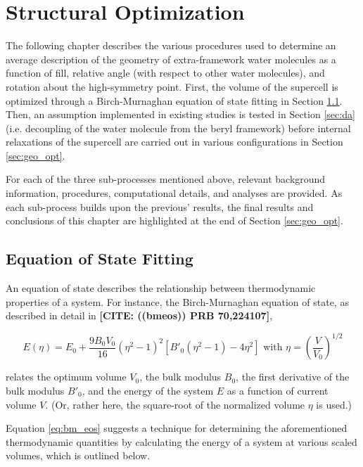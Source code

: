 \chapter{Structural Optimization}
\label{ch:struct_opt}

    
The following chapter describes the various procedures used to determine an average description of the geometry of extra-framework water molecules as a function of fill, relative angle (with respect to other water molecules), and rotation about the high-symmetry point. First, the volume of the supercell is optimized through a Birch-Murnaghan equation of state fitting in Section \ref{sec:eos}. Then, an assumption implemented in existing studies is tested in Section \ref{sec:da} (i.e. decoupling of the water molecule from the beryl framework) before internal relaxations of the supercell are carried out in various configurations in Section \ref{sec:geo_opt}.

For each of the three sub-processes mentioned above, relevant background information, procedures, computational details, and analyses are provided. As each sub-process builds upon the previous' results, the final results and conclusions of this chapter are highlighted at the end of Section \ref{sec:geo_opt}.
    
    \section{Equation of State Fitting}
    \label{sec:eos}
        
            An equation of state describes the relationship between thermodynamic properties of a system. For instance, the Birch-Murnaghan equation of state, as described in detail in \textbf{[CITE: ((bmeos)) PRB 70,224107]},
            
            \begin{equation}
            \label{eq:bm_eos}
                E(\eta) = E_0 + \frac{9B_0V_0}{16}\left(\eta^2 -1\right)^2\left[ B'_0 \left(\eta^2-1\right) -4\eta^2\right] \text{ with } \eta = \left(\frac{V}{V_0}\right)^{1/2}
            \end{equation}
            
            \noindent relates the optimum volume $V_0$, the bulk modulus $B_0$, the first derivative of the bulk modulus $B'_0$, and the energy of the system $E$ as a function of current volume $V$. (Or, rather here, the square-root of the normalized volume $\eta$ is used.)
            
            Equation \ref{eq:bm_eos} suggests a technique for determining the aforementioned thermodynamic quantities by calculating the energy of a system at various scaled volumes, which is outlined below.
            
